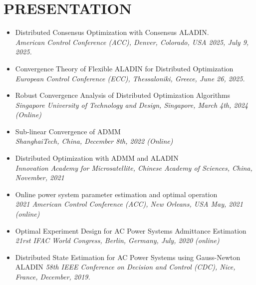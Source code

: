 \documentclass[paper=a4,fontsize=11pt]{scrartcl} %
\newcommand{\NewPart}[1]{\section*{\uppercase{#1}}}
\begin{document}
\NewPart{PRESENTATION}{}
\begin{itemize}

\item  {
	{ Distributed Consensus Optimization with Consensus ALADIN.}\\
	\emph{American Control Conference (ACC), Denver, Colorado, USA 2025, July 9, 2025.
} }

	
		\item  {
		{ Convergence Theory of Flexible ALADIN for Distributed Optimization}\\
		\emph{European Control Conference (ECC), Thessaloniki, Greece, June 26, 2025.
	} }
		\item  {
		{Robust Convergence Analysis of Distributed Optimization Algorithms}\\
		\emph{Singapore University of Technology and Design, Singapore, March 4th, 2024 (Online)
	} }
	
		\item  {
		{Sub-linear Convergence of ADMM}\\
		\emph{ShanghaiTech, China, December 8th, 2022 (Online)
	} }
	
	\item  {
		{Distributed Optimization with ADMM and ALADIN}\\
		\emph{Innovation Academy for Microsatellite, Chinese Academy of Sciences, China,
			November, 2021
	} }
	
	\item  {
		{Online power system parameter estimation and optimal operation}\\
		\emph{2021 American Control Conference (ACC), New Orleans, USA May, 2021 (online)
	} }
	
	\item  {
		Optimal Experiment Design for AC Power Systems Admittance Estimation\\
		\emph{21rst IFAC World Congress, Berlin, Germany, July, 2020 (online)
	} }
	
	\item  {
		Distributed State Estimation for AC Power Systems using Gauss-Newton ALADIN 
		\emph{58th IEEE Conference on Decision and Control (CDC),
			Nice, France, December, 2019.} }
\end{itemize}
\end{document}
